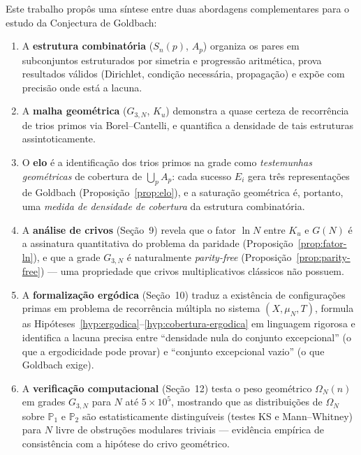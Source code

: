\documentclass[12pt,a4paper]{article}
\theoremstyle{remark}
\begin{document}
	Este trabalho prop\^os uma s\'intese entre duas abordagens complementares para o
	estudo da Conjectura de Goldbach:
	
	\begin{enumerate}
		\item A \textbf{estrutura combinat\'oria} ($S_n(p)$, $A_p$) organiza os pares
		em subconjuntos estruturados por simetria e progress\~ao aritm\'etica,
		prova resultados v\'alidos (Dirichlet, condi\c{c}\~ao necess\'aria, propaga\c{c}\~ao)
		e exp\~oe com precis\~ao onde est\'a a lacuna.
		
		\item A \textbf{malha geom\'etrica} ($G_{3,N}$, $K_u$) demonstra a quase certeza
		de recorr\^encia de trios primos via Borel--Cantelli,
		e quantifica a densidade de tais estruturas assintoticamente.
		
		\item O \textbf{elo} \'e a identifica\c{c}\~ao dos trios primos na grade como
		\emph{testemunhas geom\'etricas} de cobertura de $\bigcup_p A_p$:
		cada sucesso $E_i$ gera tr\^es representa\c{c}\~oes de Goldbach
		(Proposi\c{c}\~ao~\ref{prop:elo}), e a satura\c{c}\~ao geom\'etrica \'e,
		portanto, uma \emph{medida de densidade de cobertura} da estrutura combinat\'oria.
		
		\item A \textbf{an\'alise de crivos} (Se\c{c}\~ao~9) revela que o fator $\ln N$
		entre $K_u$ e $G(N)$ \'e a assinatura quantitativa do problema da paridade
		(Proposi\c{c}\~ao~\ref{prop:fator-ln}), e que a grade $G_{3,N}$ \'e naturalmente
		\emph{parity-free} (Proposi\c{c}\~ao~\ref{prop:parity-free}) --- uma propriedade
		que crivos multiplicativos cl\'assicos n\~ao possuem.
		
		\item A \textbf{formaliza\c{c}\~ao erg\'odica} (Se\c{c}\~ao~10) traduz a exist\^encia
		de configura\c{c}\~oes primas em problema de recorr\^encia m\'ultipla no sistema
		$(X, \mu_N, T)$, formula as Hip\'oteses~\ref{hyp:ergodica}--\ref{hyp:cobertura-ergodica}
		em linguagem rigorosa e identifica a lacuna precisa entre ``densidade nula do conjunto
		excepcional'' (o que a ergodicidade pode provar) e ``conjunto excepcional vazio''
		(o que Goldbach exige).
		
		\item A \textbf{verifica\c{c}\~ao computacional} (Se\c{c}\~ao~12) testa o peso
		geom\'etrico $\Omega_N(n)$ em grades $G_{3,N}$ para $N$ at\'e $5\times 10^5$,
		mostrando que as distribui\c{c}\~oes de $\Omega_N$ sobre $\mathbb{P}_1$ e
		$\mathbb{P}_2$ s\~ao estatisticamente distingu\'iveis (testes KS e Mann--Whitney)
		para $N$ livre de obstru\c{c}\~oes modulares triviais --- evid\^encia emp\'irica
		de consist\^encia com a hip\'otese do crivo geom\'etrico.
	\end{enumerate}
	
\end{document}
